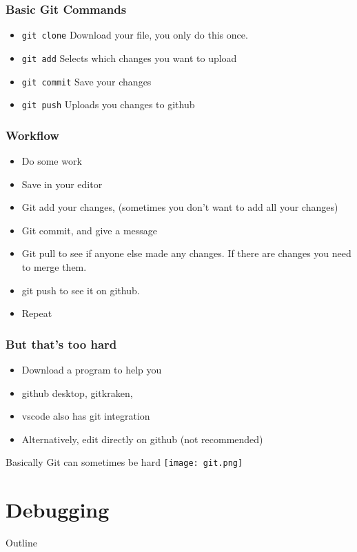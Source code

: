 \documentclass[aspectratio=169,hyperref={unicode}]{beamer}
\begin{document}
\begin{frame}
\frametitle{Basic Git Commands}
\begin{itemize}
  \item \texttt{git clone} Download your file, you only do this once.
  \item \texttt{git add} Selects which changes you want to upload
\item \texttt{git commit} Save your changes
\item \texttt{git push} Uploads you changes to github
\end{itemize}
\end{frame}


\begin{frame}
\frametitle{Workflow}
\begin{itemize}
  \item Do some work
        \item Save in your editor
        \item Git add your changes, (sometimes you don't want to add all your changes)
        \item Git commit, and give a message

        \item Git pull to see if anyone else made any changes. If there are changes you need to merge them.
        \item git push to see it on github.
        \item Repeat
\end{itemize}
\end{frame}

\begin{frame}
\frametitle{But that's too hard}
\begin{itemize}
  \item Download a program to help you
        \item github desktop, gitkraken,
        \item vscode also has git integration
        \item  Alternatively, edit directly on github (not recommended)

\end{itemize}
\end{frame}

\begin{frame}{Basically}
  Git can sometimes be hard
\texttt{[image: git.png]}
\end{frame}


\section{Debugging}
\begin{frame}{Outline}
\tableofcontents[currentsection]
\end{frame}
\end{document}
